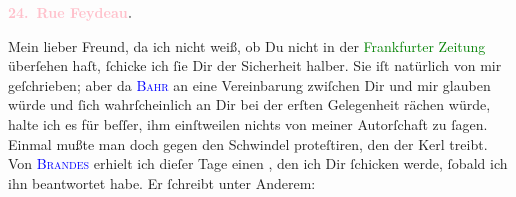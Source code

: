            \pstart
           \begin{otherlanguage}{french}\textcolor{gray}{\textbf{\textbf{\textcolor{pink}{24. Rue Feydeau}{}\ledrightnote{\textcolor{pink}{rue Feydeau}}.}}}\end{otherlanguage}\pend
           \pstart\center{}Mein lieber Freund,\pend\pstart
           da ich nicht weiß, ob Du nicht \label{K_L02800-1v}\label{K_L02800-1h} in der \textcolor{green}{Frankfurter Zeitung}{}\ledrightnote{\textcolor{green}{Frankfurter Zeitung}} überſehen haſt, ſchicke ich ſie Dir der
               Sicherheit halber. Sie iſt natürlich von mir geſchrieben; aber da \textsc{\textcolor{blue}{Bahr}{}\ledrightnote{\textcolor{blue}{Hermann Bahr}}} an eine Vereinbarung zwiſchen Dir und mir glauben würde und ſich wahrſcheinlich
               an Dir bei der erſten Gelegenheit rächen würde, halte ich es für beſſer, ihm
               einſtweilen nichts von meiner Autorſchaft zu ſagen. \strikeout{\textcolor{gray}{E}}{ }{\pb}Einmal mußte man doch gegen den Schwindel proteſtiren, den der Kerl treibt.\pend
           \pstart
           Von \textsc{\textcolor{blue}{Brandes}{}\ledrightnote{\textcolor{blue}{Georg Brandes}}} erhielt ich dieſer Tage einen \label{K_L02800-2v}\label{K_L02800-2h}, den ich Dir ſchicken werde, ſobald ich ihn beantwortet habe. Er
               ſchreibt unter Anderem:\pend
           \pstart
